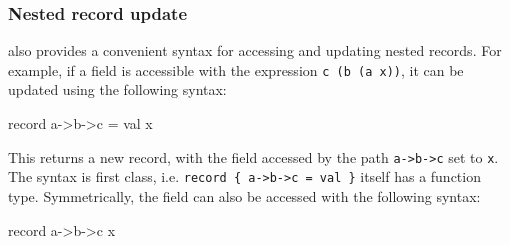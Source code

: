 \subsubsection*{Nested record update}

\Idris{} also provides a convenient syntax for accessing and updating nested
records. For example, if a field is accessible with the expression
\texttt{c (b (a x))}, it can be updated using the following syntax:

\begin{code}
record { a->b->c = val } x 
\end{code}

\noindent
This returns a new record, with the field accessed by the path 
\texttt{a->b->c} set to \texttt{x}. The syntax is first class, i.e.
\texttt{record \{ a->b->c = val \}} itself has a function type.
Symmetrically, the field can also be accessed with the following syntax:

\begin{code}
record { a->b->c } x
\end{code}


